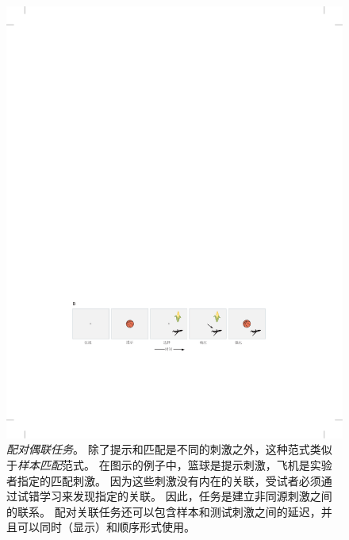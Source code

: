 \begin{figure}[htbp]
	\centering
	\includegraphics[width=0.95\linewidth]{chap24/fig_24_10_B}
	\caption{\textit{配对偶联任务}。
		除了提示和匹配是不同的刺激之外，这种范式类似于\textit{样本匹配}范式。
		在图示的例子中，篮球是提示刺激，飞机是实验者指定的匹配刺激。
		因为这些刺激没有内在的关联，受试者必须通过试错学习来发现指定的关联。
		因此，任务是建立非同源刺激之间的联系。
		配对关联任务还可以包含样本和测试刺激之间的延迟，并且可以同时（显示）和顺序形式使用。}
	\label{fig:24_10_b}
\end{figure}


